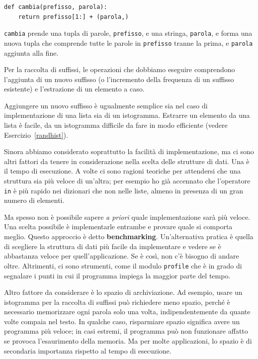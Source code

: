 \documentclass[10pt]{book}
\begin{document}
\begin{verbatim}
def cambia(prefisso, parola):
    return prefisso[1:] + (parola,)
\end{verbatim}
%
{\tt cambia} prende una tupla di parole, {\tt prefisso}, e una stringa, 
{\tt parola}, e forma una nuova tupla che comprende tutte le parole
in {\tt prefisso} tranne la prima, e {\tt parola} aggiunta alla fine.

Per la raccolta di suffissi, le operazioni che dobbiamo eseguire comprendono l'aggiunta di un nuovo suffisso (o l'incremento della frequenza di un suffisso esistente) e l'estrazione di un elemento a caso.

Aggiungere un nuovo suffisso è ugualmente semplice sia nel caso di implementazione di una lista sia di un istogramma. Estrarre un elemento da una lista è facile, da un istogramma difficile da fare in modo efficiente (vedere Esercizio~\ref{randhist}).

Sinora abbiamo considerato soprattutto la facilità di implementazione, ma ci sono altri fattori da tenere in considerazione nella scelta delle strutture di dati. Una è il tempo di esecuzione. A volte ci sono ragioni teoriche per attendersi che una struttura sia più veloce di un'altra; per esempio ho già accennato che l'operatore {\tt in} è più rapido nei dizionari che non nelle liste, almeno in presenza di un gran numero di elementi.

Ma spesso non è possibile sapere {\em a priori} quale implementazione sarà più veloce. Una scelta possibile è implementarle entrambe e provare quale si comporta meglio. Questo approccio è detto {\bf benchmarking}.  Un'alternativa pratica è quella di scegliere la struttura di dati più facile da implementare e vedere se è abbastanza veloce per quell'applicazione. Se è così, non c'è bisogno di andare oltre. Altrimenti, ci sono strumenti, come il modulo {\tt profile} che è in grado di segnalare i punti in cui il programma impiega la maggior parte del tempo.

Altro fattore da considerare è lo spazio di archiviazione. Ad esempio, usare un istogramma per la raccolta di suffissi può richiedere meno spazio, perché è necessario memorizzare ogni parola solo una volta, indipendentemente da quante volte compaia nel testo. In qualche caso, risparmiare spazio significa avere un programma più veloce; in casi estremi, il programma può non funzionare affatto se provoca l'esaurimento della memoria. Ma per molte applicazioni, lo spazio è di secondaria importanza rispetto al tempo di esecuzione.
\end{document}

